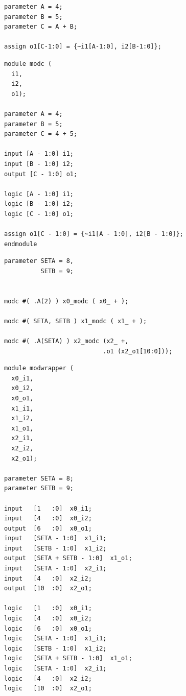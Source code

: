 \begin{figure}[p]
  \begin{minipage}[t]{.48\textwidth}
    \begin{lstlisting}[caption={Inner module: \texttt{modc} in \gls{mhdl}}, label={lst:modc in mhdl}]
parameter A = 4;
parameter B = 5; 
parameter C = A + B;

assign o1[C-1:0] = {~i1[A-1:0], i2[B-1:0]};
    \end{lstlisting}
    \begin{lstlisting}[caption={Generated \texttt{modc} in SystemVerilog}, label={lst:modc in sv}]
module modc (
  i1, 
  i2, 
  o1);

parameter A = 4;
parameter B = 5;
parameter C = 4 + 5;

input [A - 1:0] i1;
input [B - 1:0] i2;
output [C - 1:0] o1;

logic [A - 1:0] i1;
logic [B - 1:0] i2;
logic [C - 1:0] o1;

assign o1[C - 1:0] = {~i1[A - 1:0], i2[B - 1:0]};
endmodule
    \end{lstlisting}
    \begin{lstlisting}[caption={Wrapper Module in MetaHDL}, label={lst:wrapper in mhdl}]
parameter SETA = 8,
          SETB = 9;


modc #( .A(2) ) x0_modc ( x0_ + );

modc #( SETA, SETB ) x1_modc ( x1_ + );

modc #( .A(SETA) ) x2_modc (x2_ +,
                           .o1 (x2_o1[10:0]));
    \end{lstlisting}
  \end{minipage}
  \hfill
  \begin{minipage}[t]{.48\textwidth}
    \begin{lstlisting}[caption={Generated wrapper module in SystemVerilog}, label={lst:wrapper in sv}]
module modwrapper (
  x0_i1, 
  x0_i2, 
  x0_o1, 
  x1_i1, 
  x1_i2, 
  x1_o1, 
  x2_i1, 
  x2_i2, 
  x2_o1);

parameter SETA = 8;
parameter SETB = 9;

input   [1   :0]  x0_i1;
input   [4   :0]  x0_i2;
output  [6   :0]  x0_o1;
input   [SETA - 1:0]  x1_i1;
input   [SETB - 1:0]  x1_i2;
output  [SETA + SETB - 1:0]  x1_o1;
input   [SETA - 1:0]  x2_i1;
input   [4   :0]  x2_i2;
output  [10  :0]  x2_o1;

logic   [1   :0]  x0_i1;
logic   [4   :0]  x0_i2;
logic   [6   :0]  x0_o1;
logic   [SETA - 1:0]  x1_i1;
logic   [SETB - 1:0]  x1_i2;
logic   [SETA + SETB - 1:0]  x1_o1;
logic   [SETA - 1:0]  x2_i1;
logic   [4   :0]  x2_i2;
logic   [10  :0]  x2_o1;


\end{lstlisting}
\end{minipage}
\end{figure}
